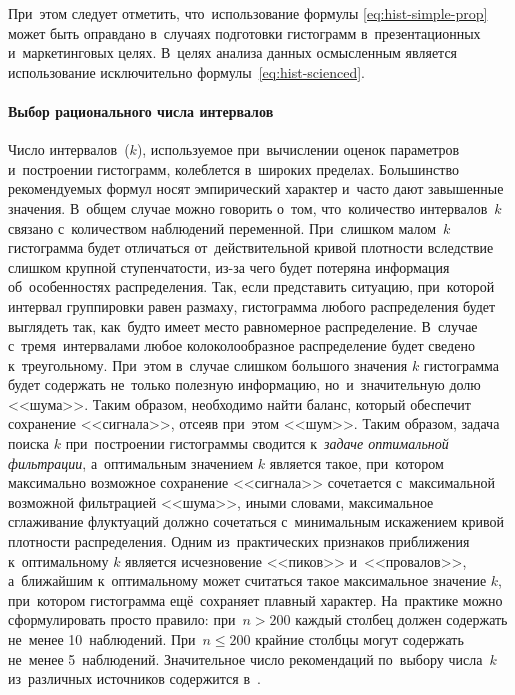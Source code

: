 \documentclass[]{scrartcl}
\begin{document}
При~этом следует отметить, что~использование формулы \ref{eq:hist-simple-prop} может быть оправдано в~случаях подготовки гистограмм в~презентационных и~маркетинговых целях. В~целях анализа данных осмысленным является использование исключительно формулы~\ref{eq:hist-scienced}.
\paragraph{Выбор рационального числа интервалов}\label{hist-number-of-k}
\par
Число интервалов~($k$), используемое при~вычислении оценок параметров и~построении гистограмм, колеблется в~широких пределах. Большинство рекомендуемых формул носят эмпирический характер и~часто дают завышенные значения. В~общем случае можно говорить о~том, что~количество интервалов~$k$ связано с~количеством наблюдений переменной. При~слишком малом~$k$ гистограмма будет отличаться от~действительной кривой плотности вследствие слишком крупной ступенчатости, из-за чего будет потеряна информация об~особенностях распределения. Так, если представить ситуацию, при~которой интервал группировки равен размаху, гистограмма любого распределения будет выглядеть так, как~будто имеет место равномерное распределение. В~случае с~тремя~интервалами любое колоколообразное распределение будет сведено к~треугольному. При~этом в~случае слишком большого значения $k$ гистограмма будет содержать не~только полезную информацию, но~и~значительную долю <<шума>>. Таким образом, необходимо найти баланс, который обеспечит сохранение <<сигнала>>, отсеяв при~этом <<шум>>. Таким образом, задача поиска $k$ при~построении гистограммы сводится к~\emph{задаче оптимальной фильтрации}, а~оптимальным значением $k$ является такое, при~котором максимально возможное сохранение <<сигнала>> сочетается с~максимальной возможной фильтрацией <<шума>>, иными словами, максимальное сглаживание флуктуаций должно сочетаться с~минимальным искажением кривой плотности распределения. Одним из~практических признаков приближения к~оптимальному $k$ является исчезновение <<пиков>> и~<<провалов>>, а~ближайшим к~оптимальному может считаться такое максимальное значение $k$, при~котором гистограмма ещё~сохраняет плавный характер. На~практике можно сформулировать просто правило: при~$n > 200$ каждый столбец должен содержать не~менее 10~наблюдений. При~$n \leq 200$ крайние столбцы могут содержать не~менее 5~наблюдений.  Значительное число рекомендаций по~выбору числа~$k$ из~различных источников содержится в~\cite{Noviczkij:oczenka-pogresh}. 
\end{document}
